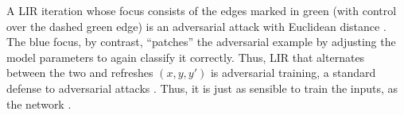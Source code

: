 \documentclass[twoside]{article}
\let\cite\citep
\theoremstyle{plain}
\theoremstyle{definition}
\theoremstyle{remark}
\newcommand{\mehran}[1]{\todo[backgroundcolor=blue!20]{\textbf{Mehran:} #1}}
\newcommand{\oliver}[1]{\todo[backgroundcolor=green!20]{\textbf{Oliver:} #1}}
\begin{document}
A LIR iteration whose focus consists of the edges marked in green (with control over the dashed green edge)
   is an adversarial attack with Euclidean distance \cite{biggio2013advattk}.
The blue focus, by contrast, ``patches'' the adversarial example by
   adjusting the model parameters to again classify it correctly.
Thus, LIR that alternates between the two and refreshes $(x,y,y')$ is adversarial training, a standard defense to adversarial attacks \cite{goodfellow2014explaining}.
%
Thus, it is just as sensible to train the inputs, as the network \cite{FNNS}.

\end{document}

